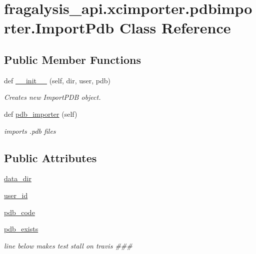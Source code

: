\hypertarget{classfragalysis__api_1_1xcimporter_1_1pdbimporter_1_1_import_pdb}{}\section{fragalysis\+\_\+api.\+xcimporter.\+pdbimporter.\+Import\+Pdb Class Reference}
\label{classfragalysis__api_1_1xcimporter_1_1pdbimporter_1_1_import_pdb}
\subsection*{Public Member Functions}
\begin{DoxyCompactItemize}
\item 
def \hyperlink{classfragalysis__api_1_1xcimporter_1_1pdbimporter_1_1_import_pdb_adce98d493e0b72a1c383d26a4a84590f}{\+\_\+\+\_\+init\+\_\+\+\_\+} (self, dir, user, pdb)
\begin{DoxyCompactList}\small\item\em Creates new Import\+P\+DB object. \end{DoxyCompactList}\item 
def \hyperlink{classfragalysis__api_1_1xcimporter_1_1pdbimporter_1_1_import_pdb_acd432818f58309c5a65c92db9ca08ada}{pdb\+\_\+importer} (self)
\begin{DoxyCompactList}\small\item\em imports .pdb files \end{DoxyCompactList}\end{DoxyCompactItemize}
\subsection*{Public Attributes}
\begin{DoxyCompactItemize}
\item 
\hyperlink{classfragalysis__api_1_1xcimporter_1_1pdbimporter_1_1_import_pdb_a682ae0196455b3ba21d1f6f8083324ea}{data\+\_\+dir}
\item 
\hyperlink{classfragalysis__api_1_1xcimporter_1_1pdbimporter_1_1_import_pdb_a4e8f2945727ef48feba2a568eab43b3b}{user\+\_\+id}
\item 
\hyperlink{classfragalysis__api_1_1xcimporter_1_1pdbimporter_1_1_import_pdb_ab65dffc1f5b788b8d47cebf3a27ea08c}{pdb\+\_\+code}
\item 
\hyperlink{classfragalysis__api_1_1xcimporter_1_1pdbimporter_1_1_import_pdb_a32f7fbde8f3a111497280a932de510e6}{pdb\+\_\+exists}
\begin{DoxyCompactList}\small\item\em line below makes test stall on travis \#\#\# \end{DoxyCompactList}\end{DoxyCompactItemize}


